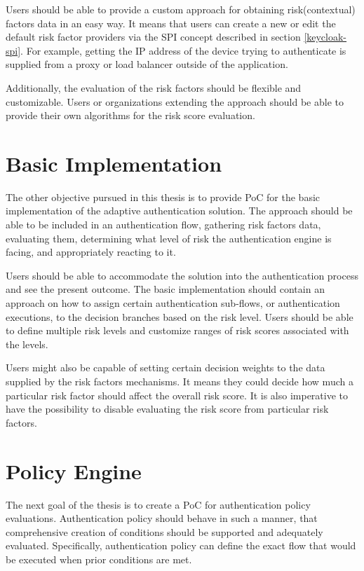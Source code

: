 Users should be able to provide a custom approach for obtaining risk(contextual) factors data in an easy way.
It means that users can create a new or edit the default risk factor providers via the SPI concept described in section \ref{keycloak-spi}.
For example, getting the IP address of the device trying to authenticate is supplied from a proxy or load balancer outside of the application.

Additionally, the evaluation of the risk factors should be flexible and customizable.
Users or organizations extending the approach should be able to provide their own algorithms for the risk score evaluation.

\section{Basic Implementation}
The other objective pursued in this thesis is to provide PoC for the basic implementation of the adaptive authentication solution.
The approach should be able to be included in an authentication flow, gathering risk factors data, evaluating them, determining what level of risk the authentication engine is facing, and appropriately reacting to it.

Users should be able to accommodate the solution into the authentication process and see the present outcome.
The basic implementation should contain an approach on how to assign certain authentication sub-flows, or authentication executions, to the decision branches based on the risk level.
Users should be able to define multiple risk levels and customize ranges of risk scores associated with the levels.

Users might also be capable of setting certain decision weights to the data supplied by the risk factors mechanisms.
It means they could decide how much a particular risk factor should affect the overall risk score.
It is also imperative to have the possibility to disable evaluating the risk score from particular risk factors.

\section{Policy Engine}
The next goal of the thesis is to create a PoC for authentication policy evaluations.
Authentication policy should behave in such a manner, that comprehensive creation of conditions should be supported and adequately evaluated.
Specifically, authentication policy can define the exact flow that would be executed when prior conditions are met.

